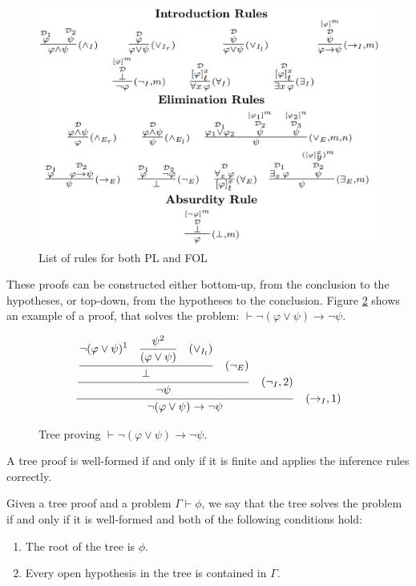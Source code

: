 \documentclass[runningheads]{llncs}
\begin{document}
\begin{figure}[H]
    \centering
    \includegraphics[width=1\linewidth]{resources/rules.png}
    \caption{List of rules for both PL and FOL}
    \label{fig:nd-rules}
\end{figure}
\vspace{-1em}

These proofs can be constructed either bottom-up, from the conclusion to the hypotheses, or top-down, from the hypotheses to the conclusion. Figure \ref{tab:proof-tree} shows an example of a proof, that solves the problem: \( \vdash \neg (\varphi \lor \psi) \to \neg \psi \).

\vspace{-1em}
\begin{figure}[h!]
    \centering
    \[
    \frac{\displaystyle \frac{\displaystyle \frac{
    \displaystyle \neg (\varphi \lor \psi)^1 \quad \displaystyle \frac{\psi^2}{(\varphi \lor \psi) \strut} \quad (\lor_{I_l}) \strut}
    {\displaystyle \bot \strut} \quad (\displaystyle \neg_E)\strut} {\displaystyle \neg \psi \strut} \quad (\neg_I, 2) \strut}
    {\neg (\varphi \lor \psi) \to \neg \psi \strut} \quad (\to_I, 1)
    \]
    \caption{Tree proving \( \vdash \neg (\varphi \lor \psi) \to \neg \psi \).}
    \label{tab:proof-tree}
\end{figure}


\begin{definition}
A tree proof is well-formed if and only if it is finite and applies the inference rules correctly.
\end{definition}

\begin{definition}
Given a tree proof and a problem \(\Gamma \vdash \phi\), we say that the tree solves the problem if and only if it is well-formed and both of the following conditions hold:
\begin{enumerate}
    \item The root of the tree is \(\phi\).
    \item Every open hypothesis in the tree is contained in \(\Gamma\).
\end{enumerate}
\end{definition}
\end{document}
